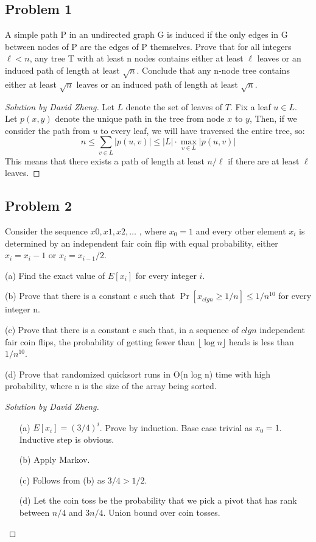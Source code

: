 \documentclass{article}
\newenvironment{solution}[1]{\begin{proof}[Solution by #1]}{\end{proof}}
\begin{document}
\subsection{Problem 1}
A simple path P in an undirected graph G is induced if the only edges in G between nodes of P are
the edges of P themselves.
Prove that for all integers $\ell < n$, any tree T with at least n nodes contains either at least $\ell$
leaves or an induced path of length at least $\sqrt{n}$. Conclude that any n-node tree contains either at
least $\sqrt{n}$ leaves or an induced path of length at least $\sqrt{n}$.
\begin{solution}{David Zheng}
Let $L$ denote the set of leaves of $T$.
Fix a leaf $u \in L$.
Let $p(x,y)$ denote the unique path in the tree from node $x$ to $y$,
Then, if we consider the path from $u$ to every leaf, we will have traversed the entire tree, so:
\[ n \le \sum_{v\in L} |p(u,v)| \le |L| \cdot \max_{v\in L} |p(u,v)| \]
This means that there exists a path of length at least $n/\ell$ if there are at least $\ell$ leaves.
\end{solution}

\subsection{Problem 2}
Consider the sequence $x0, x1, x2, \dots$ , where $x_0 = 1$ and every other element $x_i$ is determined by
an independent fair coin flip with equal probability, either $x_i = x_i-1$ or $x_i = x_{i-1}/2$.

(a) Find the exact value of $E[x_i]$ for every integer $i$.

(b) Prove that there is a constant c such that $\Pr[x_{c lg n} \ge 1/n] \le 1/n^{10}$ for every integer n.

(c) Prove that there is a constant c such that, in a sequence of $c lg n$ independent fair coin flips,
the probability of getting fewer than $\lfloor \log n \rfloor$ heads is less than $1/n^10$.

(d) Prove that randomized quicksort runs in O(n log n) time with high probability, where n is the
size of the array being sorted.
\begin{solution}{David Zheng}
\begin{enumerate}
    \item[(a)] $E[x_i] = (3/4)^i$. Prove by induction. Base case trivial as $x_0 = 1$. Inductive step is obvious.
    \item[(b)] Apply Markov.
    \item[(c)] Follows from (b) as $3/4 > 1/2$.
    \item[(d)] Let the coin toss be the probability that we pick a pivot that has rank between $n/4$ and $3n/4$. Union bound over coin tosses.
\end{enumerate}
    
\end{solution}
\end{document}
